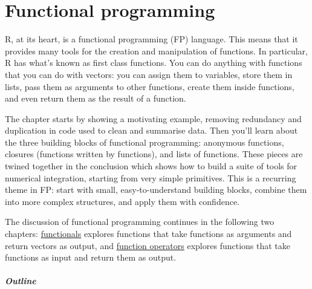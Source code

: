\hypertarget{functional-programming}{%
\chapter{Functional programming}\label{functional-programming}}

R, at its heart, is a functional programming (FP) language. This means
that it provides many tools for the creation and manipulation of
functions. In particular, R has what's known as first class functions.
You can do anything with functions that you can do with vectors: you can
assign them to variables, store them in lists, pass them as arguments to
other functions, create them inside functions, and even return them as
the result of a function. 

The chapter starts by showing a motivating example, removing redundancy
and duplication in code used to clean and summarise data. Then you'll
learn about the three building blocks of functional programming:
anonymous functions, closures (functions written by functions), and
lists of functions. These pieces are twined together in the conclusion
which shows how to build a suite of tools for numerical integration,
starting from very simple primitives. This is a recurring theme in FP:
start with small, easy-to-understand building blocks, combine them into
more complex structures, and apply them with confidence.

The discussion of functional programming continues in the following two
chapters: \protect\hyperlink{functionals}{functionals} explores
functions that take functions as arguments and return vectors as output,
and \protect\hyperlink{function-operators}{function operators} explores
functions that take functions as input and return them as output.

\hypertarget{outline}{%
\paragraph{Outline}\label{outline}}


